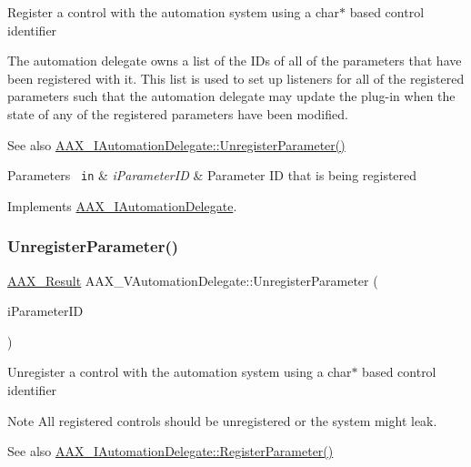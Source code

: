 Register a control with the automation system using a char$\ast$ based control identifier

The automation delegate owns a list of the I\+Ds of all of the parameters that have been registered with it. This list is used to set up listeners for all of the registered parameters such that the automation delegate may update the plug-\/in when the state of any of the registered parameters have been modified.

\begin{DoxySeeAlso}{See also}
\mbox{\hyperlink{a01773_ab1c1d4292460119b22d68247150cc1a0}{A\+A\+X\+\_\+\+I\+Automation\+Delegate\+::\+Unregister\+Parameter()}}
\end{DoxySeeAlso}

\begin{DoxyParams}[1]{Parameters}
\mbox{\texttt{ in}}  & {\em i\+Parameter\+ID} & Parameter ID that is being registered \\
\hline
\end{DoxyParams}


Implements \mbox{\hyperlink{a01773_a4d91efb2d922729d02e2ea7d7a05ed10}{A\+A\+X\+\_\+\+I\+Automation\+Delegate}}.

\mbox{\label{a01893_a35eeea2ece121cca53b285070722899c}} 
\subsubsection{\texorpdfstring{UnregisterParameter()}{UnregisterParameter()}}
{\footnotesize\ttfamily \mbox{\hyperlink{a00392_a4d8f69a697df7f70c3a8e9b8ee130d2f}{A\+A\+X\+\_\+\+Result}} A\+A\+X\+\_\+\+V\+Automation\+Delegate\+::\+Unregister\+Parameter (\begin{DoxyParamCaption}\item[{\mbox{\hyperlink{a00392_a1440c756fe5cb158b78193b2fc1780d1}{A\+A\+X\+\_\+\+C\+Param\+ID}}}]{i\+Parameter\+ID }\end{DoxyParamCaption})\hspace{0.3cm}{\ttfamily [virtual]}}

Unregister a control with the automation system using a char$\ast$ based control identifier

\begin{DoxyNote}{Note}
All registered controls should be unregistered or the system might leak.
\end{DoxyNote}
\begin{DoxySeeAlso}{See also}
\mbox{\hyperlink{a01773_a4d91efb2d922729d02e2ea7d7a05ed10}{A\+A\+X\+\_\+\+I\+Automation\+Delegate\+::\+Register\+Parameter()}}
\end{DoxySeeAlso}

